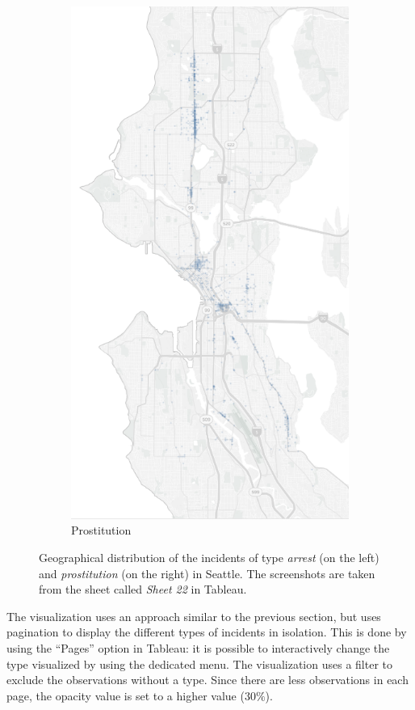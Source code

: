 \begin{figure}[h!]
\begin{subfigure}{0.5\textwidth}
        \includegraphics[width=0.8\linewidth]{figures/1_2_geographical_distribution_prostitution}
        \caption{Prostitution}
        \label{fig:1_2_prostitution}
    \end{subfigure}
    \caption{Geographical distribution of the incidents of type \textit{arrest} (on the left) and \textit{prostitution} (on the right) in Seattle. The screenshots are taken from the sheet called \textit{Sheet 22} in Tableau.}
    \label{fig:1_2_geographical_distribution_by_type}
\end{figure}

The visualization uses an approach similar to the previous section, but uses pagination to display the different types of incidents in isolation.
This is done by using the ``Pages'' option in Tableau:
it is possible to interactively change the type visualized by using the dedicated menu.
The visualization uses a filter to exclude the observations without a type.
Since there are less observations in each page, the opacity value is set to a higher value ($30\%$).

